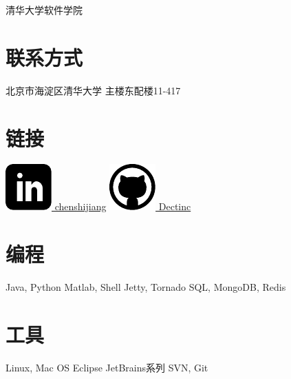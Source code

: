 \documentclass[]{friggeri-cv-cn}
\begin{document}
       {清华大学软件学院~}

\begin{aside}
  \section{联系方式}
    北京市海淀区清华大学
    主楼东配楼11-417
  \section{链接}
    \href{http://www.linkedin.com/in/chenshijiang}{\includegraphics[width=.8em]{icons/linkedin.pdf} chenshijiang}
    \href{https://github.com/Dectinc}{\includegraphics[width=.9em]{icons/github.pdf} Dectinc}
  \section{编程}
    Java, Python
    Matlab, Shell
    Jetty, Tornado
    SQL, MongoDB, Redis
  \section{工具}
    Linux, Mac OS
    Eclipse
    JetBrains系列
    SVN, Git
\end{aside}
\end{document}
